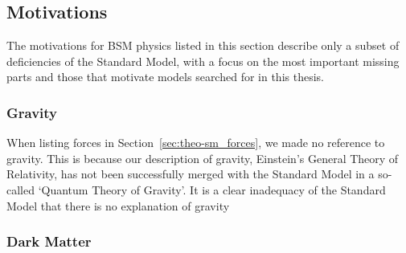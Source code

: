 \subsection{Motivations}

The motivations for BSM physics listed in this section
describe only a subset of deficiencies of the Standard Model,
with a focus on the most important missing parts and
those that motivate models searched for in this thesis.

\subsubsection{Gravity}

When listing forces in Section~\ref{sec:theo-sm_forces}, we made no reference to gravity.
This is because our description of gravity, Einstein's General Theory of Relativity,
has not been successfully merged with the Standard Model in a so-called `Quantum Theory of Gravity'.
It is a clear inadequacy of the Standard Model that there is no explanation of gravity

\subsubsection{Dark Matter}
\label{sec:theo_bsm_dm}




